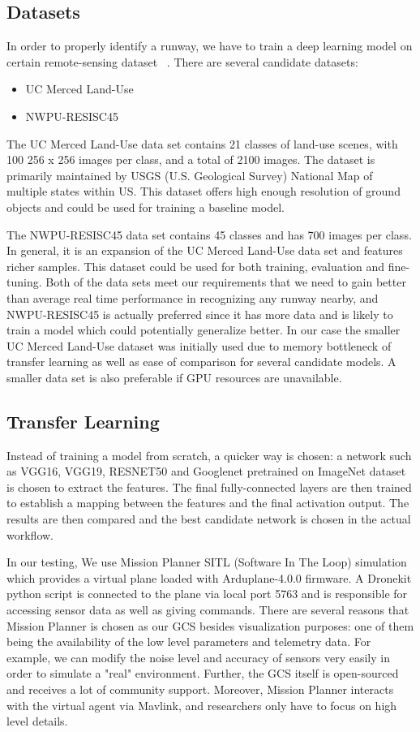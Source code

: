 \documentclass[10pt,twocolumn,letterpaper]{article}
\begin{document}
\subsection{Datasets}
In order to properly identify a runway, we have to train a deep learning model on certain remote-sensing dataset~\cite{Author3} . There are several candidate datasets:
\begin{itemize}
\item UC Merced Land-Use
\item NWPU-RESISC45
\end{itemize}
The UC Merced Land-Use data set contains 21 classes of land-use scenes, with 100 256 x 256 images per class, and a total of 2100 images. The dataset is primarily maintained by USGS (U.S. Geological Survey) National Map of multiple states within US. This dataset offers high enough resolution of ground objects and could be used for training a baseline model.

The NWPU-RESISC45 data set contains 45 classes and has 700 images per class. In general, it is an expansion of the UC Merced Land-Use data set and features richer samples. This dataset could be used for both training, evaluation and fine-tuning. Both of the data sets meet our requirements that we need to gain better than average real time performance in recognizing any runway nearby, and NWPU-RESISC45 is actually preferred since it has more data and is likely to train a model which could potentially generalize better. In our case the smaller UC Merced Land-Use dataset was initially used due to memory bottleneck of transfer learning as well as ease of comparison for several candidate models. A smaller data set is also preferable if GPU resources are unavailable.

\subsection{Transfer Learning}
Instead of training a model from scratch, a quicker way is chosen: a network such as VGG16, VGG19, RESNET50 and Googlenet pretrained on ImageNet dataset is chosen to extract the features. The final fully-connected layers are then trained to establish a mapping between the features and the final activation output. The results are then compared and the best candidate network is chosen in the actual workflow. 

In our testing, We use Mission Planner SITL (Software In The Loop) simulation which provides a virtual plane loaded with Arduplane-4.0.0 firmware. A Dronekit python script is connected to the plane via local port 5763 and is responsible for accessing sensor data as well as giving commands. There are several reasons that Mission Planner is chosen as our GCS besides visualization purposes: one of them being the availability of the low level parameters and telemetry data. For example, we can modify the noise level and accuracy of sensors very easily in order to simulate a "real" environment. Further, the GCS itself is open-sourced and receives a lot of community support. Moreover, Mission Planner interacts with the virtual agent via Mavlink, and researchers only have to focus on high level details.
\end{document}
